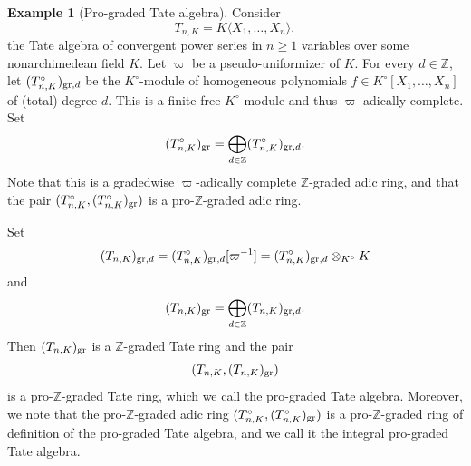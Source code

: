 \documentclass[12pt,twoside,a4paper]{article}
\theoremstyle{definition}
\newtheorem{example}[thm]{Example}
\theoremstyle{remark}
\newcommand\gr{{\rm gr}}
\begin{document}
\begin{example}[Pro-graded Tate algebra]\label{Pro-graded Tate algebra}Consider \begin{equation*}T_{n, K}=K\langle X_1,\dots, X_n\rangle,\end{equation*}the Tate algebra of convergent power series in $n\geq1$ variables over some nonarchimedean field $K$. Let $\varpi$ be a pseudo-uniformizer of $K$. For every $d\in\mathbb{Z}$, let $(T_{n, K}^{\circ})_{\gr, d}$ be the $K^{\circ}$-module of homogeneous polynomials $f\in K^{\circ}[X_1,\dots, X_n]$ of (total) degree $d$. This is a finite free $K^{\circ}$-module and thus $\varpi$-adically complete. Set \begin{equation*}(T_{n, K}^{\circ})_{\gr}=\bigoplus_{d\in\mathbb{Z}}(T_{n, K}^{\circ})_{\gr, d}.\end{equation*}Note that this is a gradedwise $\varpi$-adically complete $\mathbb{Z}$-graded adic ring, and that the pair $(T_{n, K}^{\circ}, (T_{n, K}^{\circ})_{\gr})$ is a pro-$\mathbb{Z}$-graded adic ring.

Set \begin{equation*}(T_{n, K})_{\gr, d}=(T_{n, K}^{\circ})_{\gr, d}[\varpi^{-1}]=(T_{n, K}^{\circ})_{\gr, d}\otimes_{K^{\circ}}K\end{equation*}and \begin{equation*}(T_{n, K})_{\gr}=\bigoplus_{d\in\mathbb{Z}}(T_{n, K})_{\gr, d}.\end{equation*}Then $(T_{n, K})_{\gr}$ is a $\mathbb{Z}$-graded Tate ring and the pair \begin{equation*}(T_{n, K}, (T_{n, K})_{\gr})\end{equation*}is a pro-$\mathbb{Z}$-graded Tate ring, which we call the pro-graded Tate algebra. Moreover, we note that the pro-$\mathbb{Z}$-graded adic ring $(T_{n, K}^{\circ}, (T_{n, K}^{\circ})_{\gr})$ is a pro-$\mathbb{Z}$-graded ring of definition of the pro-graded Tate algebra, and we call it the integral pro-graded Tate algebra.  \end{example}
\end{document}
